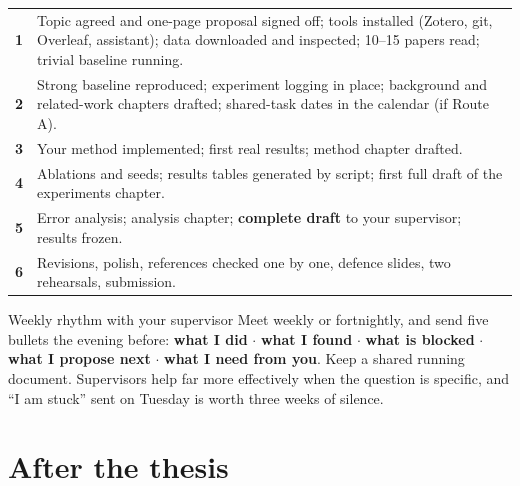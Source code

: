 \documentclass[11pt,a4paper]{article}
\begin{document}
\begin{center}
\small
\begin{tabularx}{\textwidth}{L{2.2cm} X}
\toprule
{} &  \\
\midrule
{}
\textbf{1} & Topic agreed and one-page proposal signed off; tools installed
(Zotero, git, Overleaf, assistant); data downloaded and inspected; 10--15
papers read; trivial baseline running. \\
\textbf{2} & Strong baseline reproduced; experiment logging in place;
background and related-work chapters drafted; shared-task dates in the
calendar (if Route A). \\
\textbf{3} & Your method implemented; first real results; method chapter
drafted. \\
\textbf{4} & Ablations and seeds; results tables generated by script; first
full draft of the experiments chapter. \\
\textbf{5} & Error analysis; analysis chapter; \textbf{complete draft} to your
supervisor; results frozen. \\
\textbf{6} & Revisions, polish, references checked one by one, defence slides,
two rehearsals, submission. \\
\bottomrule
\end{tabularx}
\end{center}

\begin{cbox}{Weekly rhythm with your supervisor}
Meet weekly or fortnightly, and send five bullets the evening before:
\textbf{what I did} $\cdot$ \textbf{what I found} $\cdot$ \textbf{what is
blocked} $\cdot$ \textbf{what I propose next} $\cdot$ \textbf{what I need from
you}. Keep a shared running document. Supervisors help far more effectively
when the question is specific, and ``I am stuck'' sent on Tuesday is worth
three weeks of silence.
\end{cbox}

\section{After the thesis}
\end{document}
